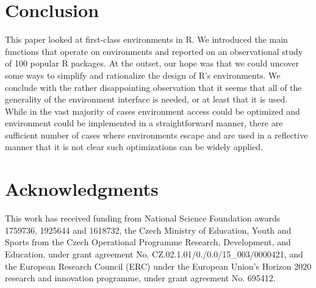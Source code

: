 \documentclass[sigplan,screen]{acmart}
\renewcommand{\c}[1]{\lstinline |#1|\xspace}
\begin{document}


\section{Conclusion}

This paper looked at first-class environments in R. We introduced the main
functions that operate on environments and reported on an observational study of
100 popular R packages. At the outset, our hope was that we could uncover some
ways to simplify and rationalize the design of R's environments. We conclude
with the rather disappointing observation that it seems that all of the
generality of the environment interface is needed, or at least that it is used.
While in the vast majority of cases environment access could be optimized and
environment could be implemented in a straightforward manner, there are
sufficient number of cases where environments escape and are used in a
reflective manner that it is not clear such optimizations can be widely applied.
\newpage
\section*{Acknowledgments}
This work has received funding from National Science Foundation awards 1759736,
1925644 and 1618732, the Czech Ministry of Education, Youth and Sports from the
Czech Operational Programme Research, Development, and Education, under grant
agreement No. CZ.02.1.01/0./0.0/15\_003/0000421, and the European Research
Council (ERC) under the European Union’s Horizon 2020 research and innovation
programme, under grant agreement No. 695412.


\end{document}
